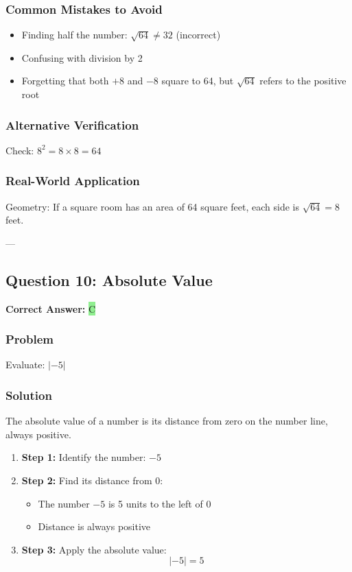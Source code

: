 \documentclass[12pt]{article}
\begin{document}
\subsubsection*{Common Mistakes to Avoid}
\begin{itemize}
\item Finding half the number: $\sqrt{64} \neq 32$ (incorrect)
\item Confusing with division by 2
\item Forgetting that both $+8$ and $-8$ square to 64, but $\sqrt{64}$ refers to the positive root
\end{itemize}

\subsubsection*{Alternative Verification}
Check: $8^2 = 8 \times 8 = 64$ 

\subsubsection*{Real-World Application}
Geometry: If a square room has an area of 64 square feet, each side is $\sqrt{64} = 8$ feet.

---

\subsection{Question 10: Absolute Value}

\textbf{Correct Answer: } \colorbox{lightgreen}{C}

\subsubsection*{Problem}
Evaluate: $|-5|$

\subsubsection*{Solution}

The absolute value of a number is its distance from zero on the number line, always positive.

\begin{enumerate}
\item \textbf{Step 1:} Identify the number: $-5$
\item \textbf{Step 2:} Find its distance from 0:
  \begin{itemize}
  \item The number $-5$ is 5 units to the left of 0
  \item Distance is always positive
  \end{itemize}
\item \textbf{Step 3:} Apply the absolute value:
  \[
  |-5| = 5
  \]
\end{enumerate}
\end{document}
